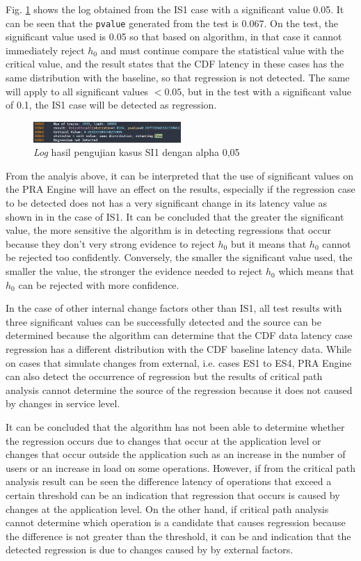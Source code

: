 \documentclass[conference]{configs/IEEEtran}
\begin{document}
Fig. \ref{result_log_1} shows the log obtained from the IS1 case with a significant value 0.05. It can be seen that the \texttt{pvalue} generated from the test is 0.067. On the test, the significant value used is 0.05 so that based on algorithm, in that case it cannot immediately reject $h_{0}$ and must continue compare the statistical value with the critical value, and the result states that the CDF latency in these cases has the same distribution with the baseline, so that regression is not detected. The same will apply to all significant values $<0.05$, but in the test with a significant value of 0.1,
the IS1 case will be detected as regression.
\begin{figure}[!htb]
	\centering
	\includegraphics[width=0.5\textwidth]{resources/ch4/log/1-log-new.png}
	\caption{\textit{Log} hasil pengujian kasus SI1 dengan alpha 0,05}
	\label{result_log_1}
\end{figure}

From the analyis above, it can be interpreted that the use of significant values on the PRA Engine will have an effect on the results, especially if the regression case to be detected does not
has a very significant change in its latency value as shown in
in the case of IS1. It can be concluded that the greater the significant value, the more sensitive the algorithm is in detecting regressions that occur because they don't
very strong evidence to reject $h_{0}$ but it means that $h_{0}$ cannot be rejected too confidently. Conversely, the smaller the significant value used, the smaller the value, the stronger the evidence needed to reject $h_{0}$ which means that $h_{0}$ can be rejected with more confidence.

In the case of other internal change factors other than IS1, all test results
with three significant values can be successfully detected and the source can be determined because the algorithm can determine that the CDF data latency case regression
has a different distribution with the CDF baseline latency data. While on cases that simulate changes from external, i.e. cases ES1 to
ES4, PRA Engine can also detect the occurrence of regression but the results of critical path analysis cannot determine the source of the regression because it does not caused by changes in service level.

It can be concluded that the algorithm has not been able to determine whether the regression
occurs due to changes that occur at the application level or changes
that occur outside the application such as an increase in the number of users or an increase in
load on some operations. However, if from the critical path analysis result can be seen the difference
latency of operations that exceed a certain threshold can be an indication that
regression that occurs is caused by changes at the application level. On the other hand, if
critical path analysis cannot determine which operation is a candidate that causes
regression because the difference is not greater than the threshold, it can be and
indication that the detected regression is due to changes caused by
by external factors.
\end{document}
